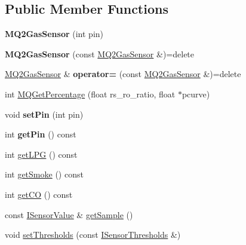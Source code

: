 \subsection*{Public Member Functions}
\begin{DoxyCompactItemize}
\item 
\mbox{\label{classathome_1_1sensor_1_1_m_q2_gas_sensor_aa311f792931e425c6d9d77bded775dfa}} 
{\bfseries M\+Q2\+Gas\+Sensor} (int pin)
\item 
\mbox{\label{classathome_1_1sensor_1_1_m_q2_gas_sensor_a93bc43d684f3d225bf5baab8048752b8}} 
{\bfseries M\+Q2\+Gas\+Sensor} (const \mbox{\hyperlink{classathome_1_1sensor_1_1_m_q2_gas_sensor}{M\+Q2\+Gas\+Sensor}} \&)=delete
\item 
\mbox{\label{classathome_1_1sensor_1_1_m_q2_gas_sensor_ab57873a8ee1bdf20619d6efa090bdd40}} 
\mbox{\hyperlink{classathome_1_1sensor_1_1_m_q2_gas_sensor}{M\+Q2\+Gas\+Sensor}} \& {\bfseries operator=} (const \mbox{\hyperlink{classathome_1_1sensor_1_1_m_q2_gas_sensor}{M\+Q2\+Gas\+Sensor}} \&)=delete
\item 
int \mbox{\hyperlink{classathome_1_1sensor_1_1_m_q2_gas_sensor_a6bf60231a95fe2ba2f5bc9c1bad714c5}{M\+Q\+Get\+Percentage}} (float rs\+\_\+ro\+\_\+ratio, float $\ast$pcurve)
\item 
\mbox{\label{classathome_1_1sensor_1_1_m_q2_gas_sensor_a872737bb858eb7e6310fb5675d0b3b72}} 
void {\bfseries set\+Pin} (int pin)
\item 
\mbox{\label{classathome_1_1sensor_1_1_m_q2_gas_sensor_a70221cb17fc88bb3784e00da53d67975}} 
int {\bfseries get\+Pin} () const
\item 
int \mbox{\hyperlink{classathome_1_1sensor_1_1_m_q2_gas_sensor_a65401612b298d829987c2b75ead8f246}{get\+L\+PG}} () const
\item 
int \mbox{\hyperlink{classathome_1_1sensor_1_1_m_q2_gas_sensor_aa6e3ad7d0382f04cf15388fd36722579}{get\+Smoke}} () const
\item 
int \mbox{\hyperlink{classathome_1_1sensor_1_1_m_q2_gas_sensor_a36cce0ec962d8b5269e39ee4c368be67}{get\+CO}} () const
\item 
const \mbox{\hyperlink{structathome_1_1sensor_1_1_i_sensor_1_1_i_sensor_value}{I\+Sensor\+Value}} \& \mbox{\hyperlink{classathome_1_1sensor_1_1_m_q2_gas_sensor_adbe1195490ce67fbed7c717abe2b5b13}{get\+Sample}} ()
\item 
void \mbox{\hyperlink{classathome_1_1sensor_1_1_m_q2_gas_sensor_a69de9f45b9babd2d111b4ce020d7c83e}{set\+Thresholds}} (const \mbox{\hyperlink{structathome_1_1sensor_1_1_i_sensor_1_1_i_sensor_thresholds}{I\+Sensor\+Thresholds}} \&)
\end{DoxyCompactItemize}
